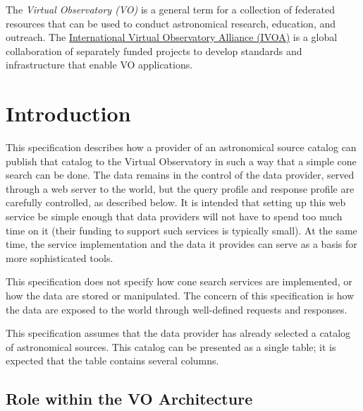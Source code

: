 \documentclass[11pt,a4paper]{ivoa}
\begin{document}
The \emph{Virtual Observatory (VO)} is a
general term for a collection of federated resources that can be used
to conduct astronomical research, education, and outreach.
The \href{http://www.ivoa.net}{International
Virtual Observatory Alliance (IVOA)} is a global
collaboration of separately funded projects to develop standards and
infrastructure that enable VO applications.


\section{Introduction}

This specification describes how a provider of an astronomical source
catalog can publish that catalog to the Virtual Observatory in such a
way that a simple cone search can be done. The data remains in the
control of the data provider, served through a web server to the world,
but the query profile and response profile are carefully controlled, as
described below. It is intended that setting up this web service be
simple enough that data providers will not have to spend too much time
on it (their funding to support such services is typically small). At
the same time, the service implementation and the data it provides can
serve as a basis for more sophisticated tools.

This specification does not specify how cone search services are
implemented, or how the data are stored or manipulated. The concern of
this specification is how the data are exposed to the world through
well-defined requests and responses.

This specification assumes that the data provider has already selected a
catalog of astronomical sources. This catalog can be presented as a
single table; it is expected that the table contains several columns.

\subsection{Role within the VO Architecture}
\end{document}
